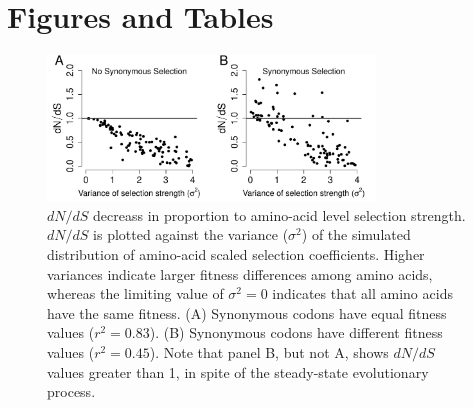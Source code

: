 \documentclass[11pt]{article}
\begin{document}
		

		
		


		
		
	
	
\section*{Figures and Tables}

\vspace{2cm}
	
\begin{figure}[htbp]
	\centerline{\includegraphics[width=8.7cm]{figures/MainText/dnds_variance.pdf}}
	\caption{\label{dnds_variance} $dN/dS$ decreass in proportion to amino-acid level selection strength. $dN/dS$ is plotted against the variance ($\sigma^2$) of the simulated distribution of amino-acid scaled selection coefficients. Higher variances indicate larger fitness differences among amino acids, whereas the limiting value of $\sigma^2 = 0$ indicates that all amino acids have the same fitness. (A) Synonymous codons have equal fitness values ($r^2=0.83$). (B) Synonymous codons have different fitness values ($r^2=0.45$). Note that panel B, but not A, shows $dN/dS$ values greater than 1, in spite of the steady-state evolutionary process.}
\end{figure}
		
		
\vspace{2cm}
		
\end{document}
